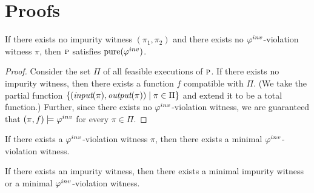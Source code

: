 \section{Proofs}

\begin{lemma}
If there exists no impurity witness $(\pi_1,\pi_2)$ and there exists
no $\varphi^{inv}$-violation witness $\pi$, then $\textsc{p}$ satisfies $\mathrm{pure}(\varphi^{inv})$.
\end{lemma}

\begin{proof}
Consider the set $\Pi$ of all feasible executions of $\textsc{p}$.
If there exists no impurity witness, then there exists a function $f$ compatible with $\Pi$.
(We take the partial function $\{ (\textit{input}(\pi), \textit{output}(\pi)) \; | \; \pi \in \Pi \}$ and
extend it to be a total function.)
Further, since there exists no $\varphi^{inv}$-violation witness, we are guaranteed that $(\pi,f) \models \varphi^{inv}$
for every $\pi \in \Pi$.
\end{proof}

\begin{lemma}
If there exists a $\varphi^{inv}$-violation witness $\pi$, then there exists a minimal $\varphi^{inv}$-violation witness.
\end{lemma}

\begin{lemma}
If there exists an impurity witness, then there exists a minimal impurity witness or a minimal
$\varphi^{inv}$-violation witness.
\end{lemma}